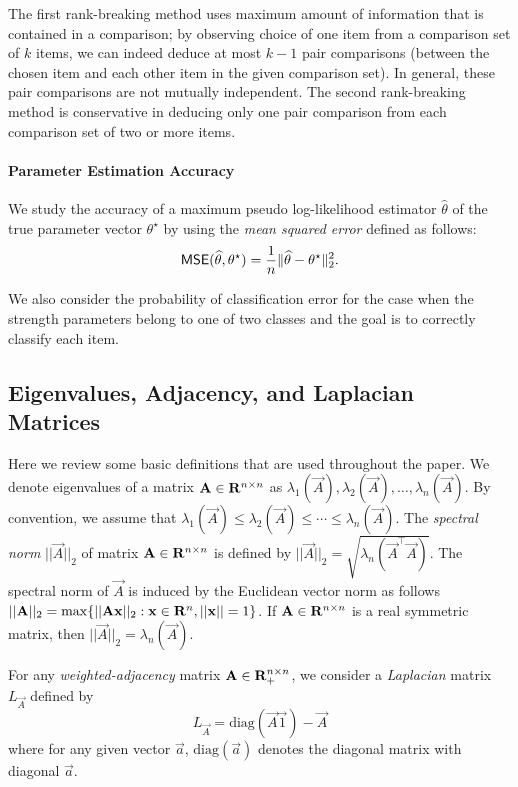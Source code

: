 The first rank-breaking method uses maximum amount of information that is contained in a comparison; by observing choice of one item from a comparison set of $k$ items, we can indeed deduce at most $k-1$ pair comparisons (between the chosen item and each other item in the given comparison set). In general, these pair comparisons are not mutually independent. The second rank-breaking method is conservative in deducing only one pair comparison from each comparison set of two or more items.  

\paragraph{Parameter Estimation Accuracy} We study the accuracy of a maximum pseudo log-likelihood estimator $\widehat \theta$ of the true parameter vector $\theta^\star$ by using the \emph{mean squared error} defined as follows:
\begin{equation}
\hbox{\textup{\textsf{MSE}}}(\widehat \theta, \theta^\star) = \frac{1}{n}\|\widehat \theta - \theta^\star\|_2^2.
\label{equ:msedef}
\end{equation}

We also consider the probability of classification error for the case when the strength parameters belong to one of two classes and the goal is to correctly classify each item.  

\subsection{Eigenvalues, Adjacency, and Laplacian Matrices}

Here we review some basic definitions that are used throughout the paper. We denote eigenvalues of a matrix $\mathbf{A}\in \mathbf{R}^{n\times n}$ as $\lambda_1(\vec{A}), \lambda_2(\vec{A}), \ldots, \lambda_n(\vec{A})$. By convention, we assume that $\lambda_1(\vec{A})\leq \lambda_2(\vec{A})\leq \cdots \leq \lambda_n(\vec{A})$. The \emph{spectral norm} $||\vec{A}||_2$ of matrix $\mathbf{A}\in \mathbf{R}^{n\times n}$ is defined by $||\vec{A}||_2 = \sqrt{\lambda_n(\vec{A}^\top \vec{A})}$. The spectral norm of $\vec{A}$ is induced by the Euclidean vector norm as follows $||\mathbf{A}||_2 = \max\{||\mathbf{A} \mathbf{x}||_2: \mathbf{x}\in \mathbf{R}^n, ||\mathbf{x}||=1\}$. If $\mathbf{A}\in \mathbf{R}^{n\times n}$ is a real symmetric matrix, then $||\vec{A}||_2 = \lambda_n(\vec{A})$. 

For any \emph{weighted-adjacency} matrix $\mathbf{A}\in \mathbf{R}^{n\times n}_+$, we consider a \emph{Laplacian} matrix $L_{\vec{A}}$ defined by
$$
L_{\vec{A}} = \mathrm{diag}(\vec{A}\vec{1}) - \vec{A}
$$ 
where for any given vector $\vec{a}$, $\mathrm{diag}(\vec{a})$ denotes the diagonal matrix with diagonal $\vec{a}$. 

